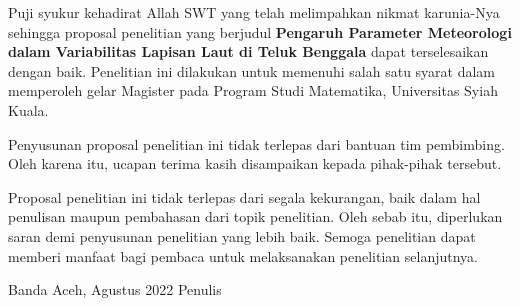 \begin{spacing}{1.5}
	\pagestyle{empty}
	
	\vskip 1cm
	\par Puji syukur kehadirat Allah SWT yang telah melimpahkan nikmat karunia-Nya sehingga proposal penelitian yang berjudul \textbf{Pengaruh Parameter Meteorologi dalam Variabilitas Lapisan Laut di Teluk Benggala} dapat terselesaikan dengan baik. Penelitian ini dilakukan untuk memenuhi salah satu syarat dalam memperoleh gelar Magister pada Program Studi Matematika, Universitas Syiah Kuala.
	\par Penyusunan proposal penelitian ini tidak terlepas dari bantuan tim pembimbing. Oleh karena itu, ucapan terima  kasih disampaikan kepada pihak-pihak tersebut.
	\par Proposal penelitian ini tidak terlepas dari segala kekurangan, baik dalam hal penulisan maupun pembahasan dari topik penelitian. Oleh sebab itu, diperlukan saran demi penyusunan penelitian yang lebih baik. Semoga penelitian dapat memberi manfaat bagi pembaca untuk melaksanakan penelitian selanjutnya.
	\vskip 1cm  
	\begin{flushright}
		Banda Aceh, Agustus 2022
		\vskip 2cm
		Penulis	
	\end{flushright}
\end{spacing}
\pagestyle{empty}